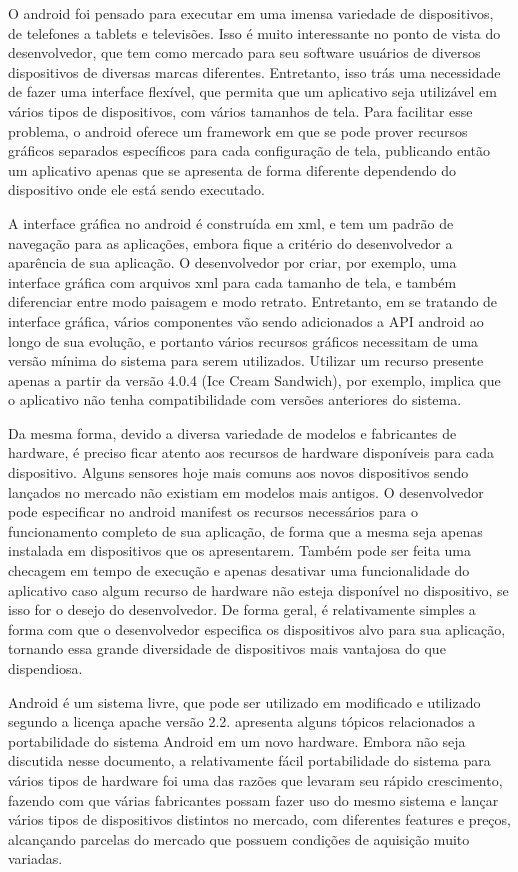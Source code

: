 O android foi pensado para executar em uma imensa variedade de dispositivos, de telefones a tablets e televisões. Isso é muito interessante no ponto de vista do desenvolvedor, que tem como mercado para seu software usuários de diversos dispositivos de diversas marcas diferentes. Entretanto, isso trás uma necessidade de fazer uma interface flexível, que permita que um aplicativo seja utilizável em vários tipos de dispositivos, com vários tamanhos de tela. Para facilitar esse problema, o android oferece um framework em que se pode prover recursos gráficos separados específicos para cada configuração de tela, publicando então um aplicativo apenas que se apresenta de forma diferente dependendo do dispositivo onde ele está sendo executado.  

A interface gráfica no android é construída em xml, e tem um padrão de navegação para as aplicações, embora fique a critério do desenvolvedor a aparência de sua aplicação. O desenvolvedor por criar, por exemplo, uma interface gráfica com arquivos xml para cada tamanho de tela, e também diferenciar entre modo paisagem e modo retrato. Entretanto, em se tratando de interface gráfica, vários componentes vão sendo adicionados a API android ao longo de sua evolução, e portanto vários recursos gráficos necessitam de uma versão mínima do sistema para serem utilizados. Utilizar um recurso presente apenas a partir da versão 4.0.4 (Ice Cream Sandwich), por exemplo, implica que o aplicativo não tenha compatibilidade com versões anteriores do sistema.  

Da mesma forma, devido a diversa variedade de modelos e fabricantes de hardware, é preciso ficar atento aos recursos de hardware disponíveis para cada dispositivo. Alguns sensores hoje mais comuns aos novos dispositivos sendo lançados no mercado não existiam em modelos mais antigos. O desenvolvedor pode especificar no android manifest os recursos necessários para o funcionamento completo de sua aplicação, de forma que a mesma seja apenas instalada em dispositivos que os apresentarem. Também pode ser feita uma checagem em tempo de execução e apenas desativar uma funcionalidade do aplicativo caso algum recurso de hardware não esteja disponível no dispositivo, se isso for o desejo do desenvolvedor. De forma geral, é relativamente simples a forma com que o desenvolvedor especifica os dispositivos alvo para sua aplicação, tornando essa grande diversidade de dispositivos mais vantajosa do que dispendiosa. 

Android é um sistema livre, que pode ser utilizado em modificado e utilizado segundo a licença apache versão 2.2.  apresenta alguns tópicos relacionados a portabilidade do sistema Android em um novo hardware. Embora não seja discutida nesse documento, a relativamente fácil portabilidade do sistema para vários tipos de hardware foi uma das razões que levaram seu rápido crescimento, fazendo com que várias fabricantes possam fazer uso do mesmo sistema e lançar vários tipos de dispositivos distintos no mercado, com diferentes features e preços, alcançando parcelas do mercado que possuem condições de aquisição muito variadas.





